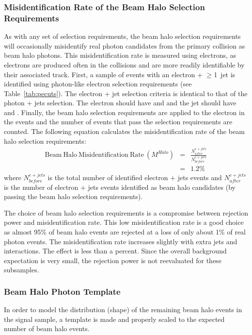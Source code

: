 \subsubsection{Misidentification Rate of the Beam Halo Selection Requirements}
As with any set of selection requirements, the beam halo selection requirements will occasionally misidentify real photon candidates from the primary collision as beam halo photons. This misidentification rate is measured using electrons, as electrons are produced often in the collisions and are more readily identifiable by their associated track. First, a sample of events with an electron + $\geq$1~jet is identified using photon-like electron selection requirements (see Table~\ref{tab:pecuts}). The electron + jet selection criteria is identical to that of the photon + jets selection. The electron should have  and  and the jet should have  and . Finally, the beam halo selection requirements are applied to the electron in the events and the number of events that pass the selection requirements are counted. The following equation calculates the misidentification rate of the beam halo selection requirements:
\begin{eqnarray}
\mathrm{Beam~Halo~Misidentification~Rate}~(M^{Halo}) &=& \frac{N^{e+jets}_{after}}{N^{e+jets}_{before}}\\
 &=& 1.2\%
\label{eqa:HaloMisIdRate}
\end{eqnarray}
\noindent where $N^{e+jets}_{before}$ is the total number of identified electron + jets events and $N^{e+jets}_{after}$ is the number of electron + jets events identified as beam halo candidates (by passing the beam halo selection requirements).

The choice of beam halo selection requirements is a compromise between rejection power and misidentification rate. This low misidentification rate is a good choice as almost 95\% of beam halo events are rejected at a loss of only about 1\% of real photon events. The misidentification rate increases slightly with extra jets and interactions. The effect is less than a percent. Since the overall background expectation is very small, the rejection power is not reevaluated for these subsamples.

\subsubsection{Beam Halo Photon Template}
In order to model the distribution (shape) of the remaining beam halo events in the signal sample, a template is made and properly scaled to the expected number of beam halo events.


